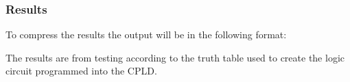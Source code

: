 \subsubsection{Results}
To compress the results the output will be in the following format:
\begin{table}[h]
\centering
{}
\caption{Results example}
\label{resultsexample}
\end{table}
The results are from testing according to the truth table used to create the logic circuit programmed into the CPLD.
